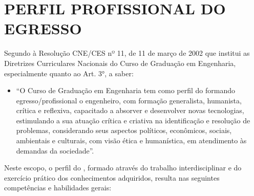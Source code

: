 \clearpage\section{PERFIL PROFISSIONAL DO EGRESSO}
Segundo à Resolução CNE/CES nº 11, de 11 de março de 2002 que institui as Diretrizes Curriculares Nacionais do Curso de Graduação em Engenharia, especialmente quanto ao Art. 3°, a saber:

\begin{itemize}
	\item “O Curso de Graduação em Engenharia tem como perfil do formando egresso/profissional o engenheiro, com formação generalista, humanista, crítica e reflexiva, capacitado a absorver e desenvolver novas tecnologias, estimulando a sua atuação crítica e criativa na identificação e resolução de problemas, considerando seus aspectos políticos, econômicos, sociais, ambientais e culturais, com visão ética e humanística, em atendimento às demandas da sociedade”.
\end{itemize}

Neste escopo, o perfil do \NOMEPROFISSIONAL, formado através do trabalho interdisciplinar e do exercício prático dos conhecimentos adquiridos, resulta nas seguintes competências e habilidades gerais:

